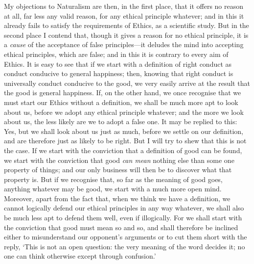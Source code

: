 My objections to Naturalism are then, in the first place, that it
offers no reason at all, far less any valid reason, for any ethical
principle whatever; and in this it already fails to satisfy the
requirements of Ethics, as a scientific study. But in the second place
I contend that, though it gives a reason for no ethical principle, it
is a \textit{cause} of the acceptance of false principles---it deludes
the mind into accepting ethical principles, which are false; and in
this it is contrary to every aim of Ethics. It is easy to see that if
we start with a definition of right conduct as conduct conducive to
general happiness; then, knowing that right conduct is universally
conduct conducive to the good, we very easily arrive at the result
that the good is general happiness. If, on the other hand, we once
recognise that we must start our Ethics without a definition, we shall
be much more apt to look about us, before we adopt any ethical
principle whatever; and the more we look about us, the less likely are
we to adopt a false one. It may be replied to this: Yes, but we shall
look about us just as much, before we settle on our definition, and
are therefore just as likely to be right. But I will try to shew that
this is not the case. If we start with the conviction that a
definition of good can be found, we start with the conviction that
good \textit{can mean} nothing else than some one property of things;
and our only business will then be to discover what that property is.
But if we recognise that, so far as the meaning of good goes, anything
whatever may be good, we start with a much more open mind. Moreover,
apart from the fact that, when we think we have a definition, we
cannot logically defend our ethical principles in any way whatever, we
shall also be much less apt to defend them well, even if illogically.
For we shall start with the conviction that good  must mean
so and so, and shall therefore be inclined either to misunderstand our
opponent's arguments or to cut them short with the reply, `This is not
an open question: the very meaning of the word decides it; no one can
think otherwise except through confusion.'


